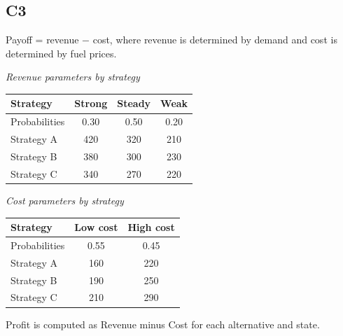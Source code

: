 \begin{ExamProblems}
		\subsection*{C3}
		Payoff = revenue $-$ cost, where revenue is determined by demand and cost is determined by fuel prices.
		\begin{center}
			\begin{minipage}[t]{0.48\linewidth}
				\textit{Revenue parameters by strategy}
				\begin{center}
					\begin{tabular}{l c c c}
						\toprule
						Strategy & Strong & Steady & Weak \\
						\midrule
						Probabilities & 0.30 & 0.50 & 0.20 \\
						Strategy A & 420 & 320 & 210 \\
						Strategy B & 380 & 300 & 230 \\
						Strategy C & 340 & 270 & 220 \\
						\bottomrule
					\end{tabular}
				\end{center}
			\end{minipage}
			\hfill
			\begin{minipage}[t]{0.48\linewidth}
				\textit{Cost parameters by strategy}
				\begin{center}
					\begin{tabular}{l c c}
						\toprule
						Strategy & Low cost & High cost \\
						\midrule
						Probabilities& 0.55 & 0.45 \\
						Strategy A & 160 & 220 \\
						Strategy B & 190 & 250 \\
						Strategy C & 210 & 290 \\
						\bottomrule
					\end{tabular}
				\end{center}
			\end{minipage}
		\end{center}
		Profit is computed as Revenue minus Cost for each alternative and state.


\end{ExamProblems}
